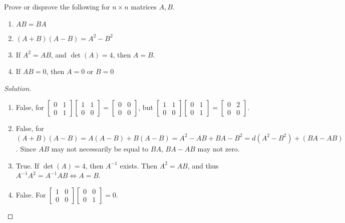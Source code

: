 \documentclass[../main.tex]{subfiles}
\begin{document}
\begin{problem}
Prove or disprove the following for $n\times n$ matrices $A, B$.
\begin{enumerate}
\item $AB = BA$
\item $(A+B)(A-B) = A^2 - B^2$
\item If $A^2 = AB$, and $\det(A) = 4$, then $A=B$.
\item If $AB = 0$, then $A=0$ or $B=0$
\end{enumerate}
\end{problem}
\begin{proof}[Solution]
\
\begin{enumerate}
\item False, for $\begin{bmatrix} 0 & 1 \\ 0 & 1\end{bmatrix} \begin{bmatrix} 1 & 1 \\ 0 & 0 \end{bmatrix} = \begin{bmatrix} 0 & 0 \\ 0 & 0\end{bmatrix}$, but $\begin{bmatrix} 1 & 1 \\ 0 & 0 \end{bmatrix}\begin{bmatrix} 0 & 1 \\ 0 & 1\end{bmatrix}  = \begin{bmatrix} 0 & 2 \\ 0 & 0 \end{bmatrix}$.
\item False, for $(A+B)(A-B) = A(A-B) + B(A-B) = A^2-AB+BA - B^2 =d (A^2-B^2) + (BA-AB)$. Since $AB$ may not necessarily be equal to $BA$, $BA-AB$ may not zero.
\item True. If $\det(A) = 4$, then $A^{-1}$ exists. Then $A^2 = AB$, and thus $A^{-1}A^2  = A^{-1}AB \Leftrightarrow A = B$.
\item False. For $\begin{bmatrix} 1 & 0 \\ 0 & 0 \end{bmatrix} \begin{bmatrix} 0 & 0 \\ 0 & 1 \end{bmatrix} = 0$.
\end{enumerate}
\end{proof}
%
\end{document}
